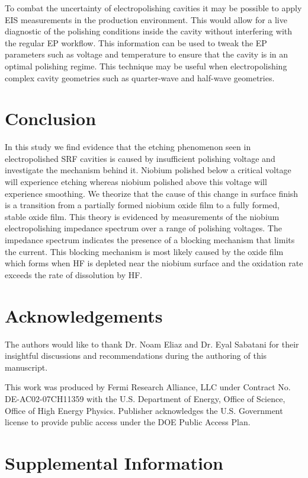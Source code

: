 To combat the uncertainty of electropolishing cavities it may be possible to apply EIS measurements in the production environment. This would allow for a live diagnostic of the polishing conditions inside the cavity without interfering with the regular EP workflow. This information can be used to tweak the EP parameters such as voltage and temperature to ensure that the cavity is in an optimal polishing regime. This technique may be useful when electropolishing complex cavity geometries such as quarter-wave and half-wave geometries.



\section{Conclusion}
\label{sec:org57282ed}
In this study we find evidence that the etching phenomenon seen in electropolished SRF cavities is caused by insufficient polishing voltage and investigate the mechanism behind it. Niobium polished below a critical voltage will experience etching whereas niobium polished above this voltage will experience smoothing. We theorize that the cause of this change in surface finish is a transition from a partially formed niobium oxide film to a fully formed, stable oxide film. This theory is evidenced by measurements of the niobium electropolishing impedance spectrum over a range of polishing voltages. The impedance spectrum indicates the presence of a blocking mechanism that limits the current. This blocking mechanism is most likely caused by the oxide film which forms when HF is depleted near the niobium surface and the oxidation rate exceeds the rate of dissolution by HF.


\section{Acknowledgements}

The authors would like to thank Dr. Noam Eliaz and Dr. Eyal Sabatani for their insightful discussions and recommendations during the authoring of this manuscript.

This work was produced by Fermi Research Alliance, LLC under Contract No. DE-AC02-07CH11359 with the U.S. Department of Energy, Office of Science, Office of High Energy Physics. Publisher acknowledges the U.S. Government license to provide public access under the DOE Public Access Plan.



\section{Supplemental Information}
\label{sec:sup}

